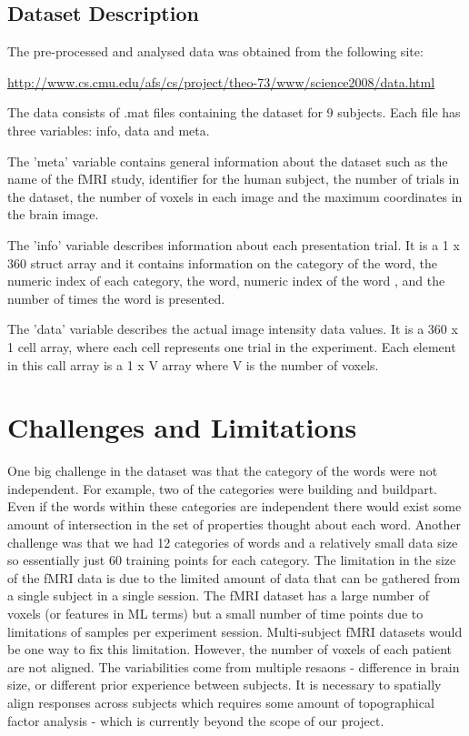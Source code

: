 \documentclass{article}
\begin{document}
\subsection{Dataset Description}

The pre-processed and analysed data was obtained from the following site:
\begin{center}
  \url{http://www.cs.cmu.edu/afs/cs/project/theo-73/www/science2008/data.html}
\end{center}

The data consists of .mat files containing the dataset for 9 subjects. Each file has three variables: info,
data and meta. 

The 'meta' variable contains general information about the dataset such as the name of the fMRI study,
identifier for the human subject, the number of trials in the dataset, the number of voxels in each image and the 
maximum coordinates in the brain image. 

The 'info' variable describes information about each presentation trial. It is a 1 x 360 struct array and it
contains information on the category of the word, the numeric index of each category, the word, numeric index 
of the word , and the number of times the word is presented.

The 'data' variable describes the actual image intensity data values. It is a 360 x 1 cell array, where each cell
represents one trial in the experiment. Each element in this call array is a 1 x V array where V is the number of 
voxels.

\section{Challenges and Limitations}

One big challenge in the dataset was that the category of the words were not independent. For example, two of the categories were building and buildpart. 
Even if the words within these categories are independent there would exist some amount of intersection in the set of properties thought about each word.
Another challenge was that we had 12 categories of words and a relatively small data size so essentially just 60 training points for each category.
The limitation in the size of the fMRI data is due to the limited amount of data that can be gathered from a single subject in a 
single session. The fMRI dataset has a large number of voxels (or features in ML terms) but a small number of time 
points due to limitations of samples per experiment session. Multi-subject fMRI datasets would be one way to fix this limitation. 
However, the number of voxels of each patient are not aligned. The variabilities come from multiple resaons - difference 
in brain size, or different prior experience between subjects. It is necessary to spatially align responses across subjects which 
requires some amount of topographical factor analysis - which is currently beyond the scope of our project.
\end{document}
